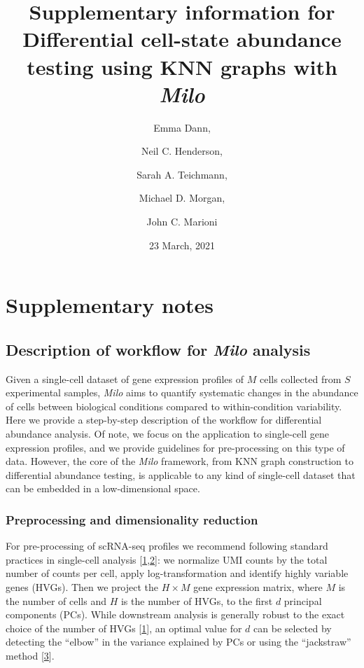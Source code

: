 \documentclass[
]{article}
\title{Supplementary information for
\textbf{Differential cell-state abundance testing using KNN graphs with \emph{Milo}}}
\author{Emma Dann, \and Neil C. Henderson, \and Sarah A. Teichmann, \and Michael D. Morgan, \and John C. Marioni}
\date{23 March, 2021}
\begin{document}
\maketitle

{
\setcounter{tocdepth}{3}
\tableofcontents
}
\renewcommand{\figurename}{Supplementary Figure}

\newpage

\hypertarget{supplementary-notes}{%
\section{Supplementary notes}\label{supplementary-notes}}

\hypertarget{description-of-workflow-for-milo-analysis}{%
\subsection{\texorpdfstring{Description of workflow for \emph{Milo} analysis}{Description of workflow for Milo analysis}}\label{description-of-workflow-for-milo-analysis}}

Given a single-cell dataset of gene expression profiles of \(M\) cells collected from \(S\) experimental samples, \emph{Milo} aims to quantify systematic changes in the abundance of cells between biological conditions compared to within-condition variability. Here we provide a step-by-step description of the workflow for differential abundance analysis. Of note, we focus on the application to single-cell gene expression profiles, and we provide guidelines for pre-processing on this type of data. However, the core of the \emph{Milo} framework, from KNN graph construction to differential abundance testing, is applicable to any kind of single-cell dataset that can be embedded in a low-dimensional space.

\hypertarget{pp}{%
\subsubsection{Preprocessing and dimensionality reduction}\label{pp}}

For pre-processing of scRNA-seq profiles we recommend following standard practices in single-cell analysis {[}\protect\hyperlink{ref-lueckenCurrentBestPractices2019}{1},\protect\hyperlink{ref-amezquitaOrchestratingSinglecellAnalysis2020}{2}{]}: we normalize UMI counts by the total number of counts per cell, apply log-transformation and identify highly variable genes (HVGs). Then we project the \(H \times M\) gene expression matrix, where \(M\) is the number of cells and \(H\) is the number of HVGs, to the first \(d\) principal components (PCs). While downstream analysis is generally robust to the exact choice of the number of HVGs {[}\protect\hyperlink{ref-lueckenCurrentBestPractices2019}{1}{]}, an optimal value for \(d\) can be selected by detecting the ``elbow'' in the variance explained by PCs or using the ``jackstraw'' method {[}\protect\hyperlink{ref-chungStatisticalSignificanceVariables2015}{3}{]}.
\end{document}
